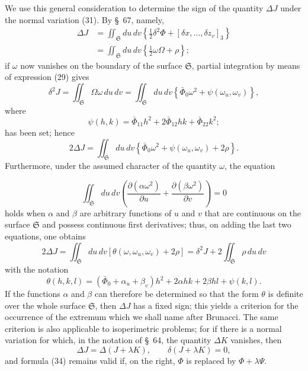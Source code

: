 \documentclass[11pt,a4paper,leqno]{article}
\begin{document}
We use this general consideration to determine the sign of the quantity
$\Delta J$ under the normal variation (31). By \S~67, namely,
\[
\begin{aligned}
\Delta J
&=\iint_{\mathfrak{S}}du\,dv
\left\{\tfrac12\delta^2\Phi+[\delta x,\ldots,\delta z_v]_3\right\}\\
&=\iint_{\mathfrak{S}}du\,dv\left\{\tfrac12\omega\Omega+\rho\right\};
\end{aligned}
\]
if $\omega$ now vanishes on the boundary of the surface $\mathfrak{S}$,
partial integration by means of expression (29) gives
\begin{equation}\tag{33}
\delta^2J=\iint_{\mathfrak{S}}\Omega\omega\,du\,dv
=\iint_{\mathfrak{S}}du\,dv
\left\{\bar\Phi_0\omega^2+\psi(\omega_u,\omega_v)\right\},
\end{equation}
where
\[
\psi(h,k)=\bar\Phi_{11}h^2+2\bar\Phi_{12}hk+\bar\Phi_{22}k^2;
\]
has been set; hence
\[
2\Delta J=\iint_{\mathfrak{S}}du\,dv
\left\{\bar\Phi_0\omega^2+\psi(\omega_u,\omega_v)+2\rho\right\}.
\]
Furthermore, under the assumed character of the quantity $\omega$, the
equation

\[
\iint_{\mathfrak{S}}du\,dv
\left(\frac{\partial(\alpha\omega^2)}{\partial u}
+\frac{\partial(\beta\omega^2)}{\partial v}\right)=0
\]
holds when $\alpha$ and $\beta$ are arbitrary functions of $u$ and $v$ that
are continuous on the surface $\mathfrak{S}$ and possess continuous first
derivatives; thus, on adding the last two equations, one obtains
\begin{equation}\tag{34}
2\Delta J=\iint_{\mathfrak{S}}du\,dv
[\theta(\omega,\omega_u,\omega_v)+2\rho]
=\delta^2J+2\iint_{\mathfrak{S}}\rho\,du\,dv
\end{equation}
with the notation
\[
\theta(h,k,l)=(\bar\Phi_0+\alpha_u+\beta_v)h^2
+2\alpha hk+2\beta hl+\psi(k,l).
\]
If the functions $\alpha$ and $\beta$ can therefore be determined so that
the form $\theta$ is definite over the whole surface $\mathfrak{S}$, then
$\Delta J$ has a fixed sign; this yields a criterion for the occurrence of
the extremum which we shall name after Brunacci. The same criterion is also
applicable to isoperimetric problems; for if there is a normal variation for
which, in the notation of \S~64, the quantity $\Delta K$ vanishes, then
\[
\Delta J=\Delta(J+\lambda K),\qquad \delta(J+\lambda K)=0,
\]
and formula (34) remains valid if, on the right, $\Phi$ is replaced by
$\Phi+\lambda\Psi$.
\end{document}
